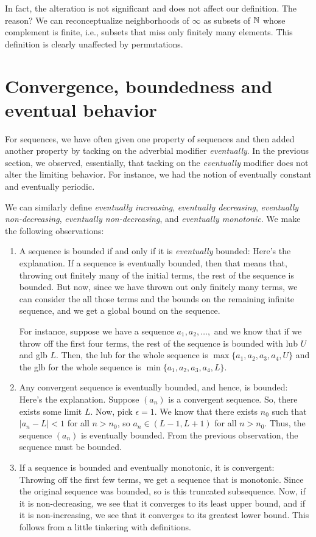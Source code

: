\documentclass[10pt]{amsart}
\begin{document}
In fact, the alteration is not significant and does not affect our
definition. The reason? We can reconceptualize neighborhoods of
$\infty$ as subsets of $\mathbb{N}$ whose complement is finite, i.e., subsets
that miss only finitely many elements. This definition is clearly
unaffected by permutations.

\section{Convergence, boundedness and eventual behavior}

For sequences, we have often given one property of sequences and then
added another property by tacking on the adverbial modifier {\em
eventually}. In the previous section, we observed, essentially, that
tacking on the {\em eventually} modifier does not alter the limiting
behavior. For instance, we had the notion of eventually constant and
eventually periodic.

We can similarly define {\em eventually increasing}, {\em eventually
decreasing}, {\em eventually non-decreasing}, {\em eventually
non-decreasing}, and {\em eventually monotonic}. We make the following
observations:

\begin{enumerate}
\item A sequence is bounded if and only if it is {\em eventually}
  bounded: Here's the explanation. If a sequence is eventually
  bounded, then that means that, throwing out finitely many of the
  initial terms, the rest of the sequence is bounded. But now, since
  we have thrown out only finitely many terms, we can consider the all
  those terms and the bounds on the remaining infinite sequence, and
  we get a global bound on the sequence.

  For instance, suppose we have a sequence $a_1, a_2, \dots,$ and we
  know that if we throw off the first four terms, the rest of the
  sequence is bounded with lub $U$ and glb $L$. Then, the lub for the
  whole sequence is $\max \{ a_1, a_2, a_3, a_4, U \}$ and the glb for
  the whole sequence is $\min \{ a_1, a_2, a_3, a_4, L \}$.
\item Any convergent sequence is eventually bounded, and hence, is
  bounded: Here's the explanation. Suppose $(a_n)$ is a convergent
  sequence. So, there exists some limit $L$. Now, pick $\epsilon =
  1$. We know that there exists $n_0$ such that $|a_n - L| < 1$ for
  all $n > n_0$, so $a_n \in (L - 1,L + 1)$ for all $n > n_0$. Thus,
  the sequence $(a_n)$ is eventually bounded. From the previous
  observation, the sequence must be bounded.
\item If a sequence is bounded and eventually monotonic, it is
  convergent: Throwing off the first few terms, we get a sequence that
  is monotonic. Since the original sequence was bounded, so is this
  truncated subsequence. Now, if it is non-decreasing, we see that it
  converges to its least upper bound, and if it is non-increasing, we
  see that it converges to its greatest lower bound. This follows from
  a little tinkering with definitions.
\end{enumerate}
\end{document}
